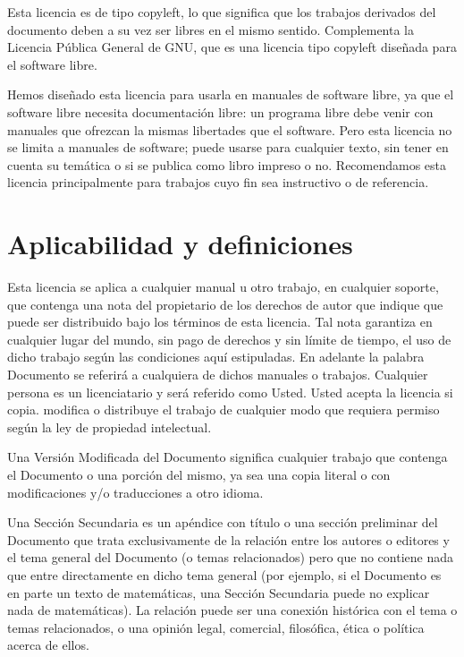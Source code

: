 Esta licencia es de tipo copyleft, lo que significa que los trabajos
derivados del documento deben a su vez ser libres en el mismo sentido.
Complementa la Licencia Pública General de GNU, que es una licencia
tipo copyleft diseñada para el software libre.

Hemos diseñado esta licencia para usarla en manuales de software
libre, ya que el software libre necesita documentación libre: un
programa libre debe venir con manuales que ofrezcan la mismas
libertades que el software. Pero esta licencia no se limita a manuales
de software; puede usarse para cualquier texto, sin tener en cuenta su
temática o si se publica como libro impreso o no. Recomendamos esta
licencia principalmente para trabajos cuyo fin sea instructivo o de
referencia.



\section{Aplicabilidad y definiciones}

Esta licencia se aplica a cualquier manual u otro trabajo, en
cualquier soporte, que contenga una nota del propietario de los
derechos de autor que indique que puede ser distribuido bajo los
términos de esta licencia. Tal nota garantiza en cualquier lugar del
mundo, sin pago de derechos y sin límite de tiempo, el uso de dicho
trabajo según las condiciones aquí estipuladas. En adelante la palabra
Documento se referirá a cualquiera de dichos manuales o trabajos.
Cualquier persona es un licenciatario y será referido como Usted.
Usted acepta la licencia si copia. modifica o distribuye el trabajo de
cualquier modo que requiera permiso según la ley de propiedad
intelectual.

Una Versión Modificada del Documento significa cualquier trabajo que
contenga el Documento o una porción del mismo, ya sea una copia
literal o con modificaciones y/o traducciones a otro idioma.

Una Sección Secundaria es un apéndice con título o una sección
preliminar del Documento que trata exclusivamente de la relación entre
los autores o editores y el tema general del Documento (o temas
relacionados) pero que no contiene nada que entre directamente en
dicho tema general (por ejemplo, si el Documento es en parte un texto
de matemáticas, una Sección Secundaria puede no explicar nada de
matemáticas). La relación puede ser una conexión histórica con el tema
o temas relacionados, o una opinión legal, comercial, filosófica,
ética o política acerca de ellos.

